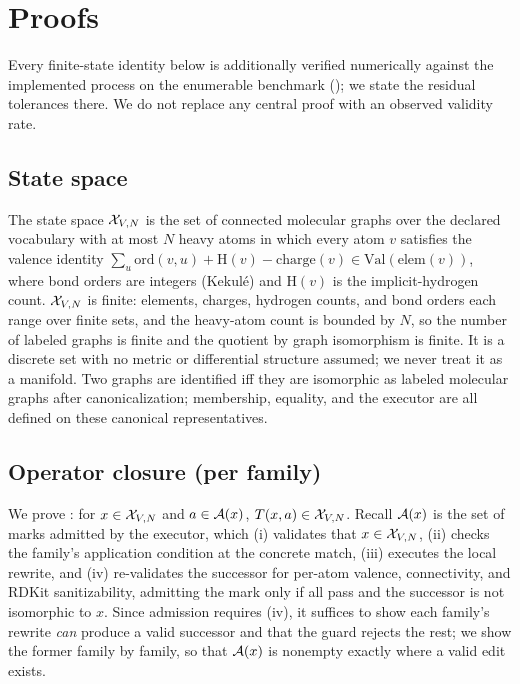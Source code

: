 \section{Proofs}
\label{app:proofs}

Every finite-state identity below is additionally verified numerically against the implemented process on
the enumerable benchmark (); we state the residual tolerances there. We do not replace any
central proof with an observed validity rate.

\subsection{State space}
\label{app:state}
The state space $\mathcal{X}_{V,N}$ is the set of connected molecular graphs over the declared vocabulary with at most
$N$ heavy atoms in which every atom $v$ satisfies the valence identity $\sum_{u}\mathrm{ord}(v,u)+
\mathrm{H}(v)-\mathrm{charge}(v)\in\mathrm{Val}(\mathrm{elem}(v))$, where bond orders are integers
(Kekul\'e) and $\mathrm{H}(v)$ is the implicit-hydrogen count. $\mathcal{X}_{V,N}$ is finite: elements, charges,
hydrogen counts, and bond orders each range over finite sets, and the heavy-atom count is bounded by $N$,
so the number of labeled graphs is finite and the quotient by graph isomorphism is finite. It is a
discrete set with no metric or differential structure assumed; we never treat it as a manifold. Two graphs
are identified iff they are isomorphic as labeled molecular graphs after canonicalization; membership,
equality, and the executor are all defined on these canonical representatives.

\subsection{Operator closure (per family)}
\label{app:closure}
We prove : for $x\in\mathcal{X}_{V,N}$ and $a\in\mathcal{A}(x)$, $T(x,a)\in\mathcal{X}_{V,N}$. Recall $\mathcal{A}(x)$ is
the set of marks admitted by the executor, which (i) validates that $x\in\mathcal{X}_{V,N}$, (ii) checks the family's
application condition at the concrete match, (iii) executes the local rewrite, and (iv) re-validates the
successor for per-atom valence, connectivity, and RDKit sanitizability, admitting the mark only if all
pass and the successor is not isomorphic to $x$. Since admission requires (iv), it suffices to show each
family's rewrite \emph{can} produce a valid successor and that the guard rejects the rest; we show the
former family by family, so that $\mathcal{A}(x)$ is nonempty exactly where a valid edit exists.

